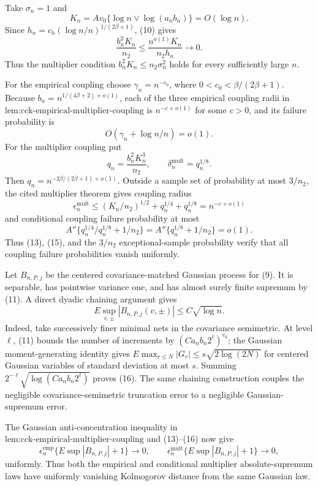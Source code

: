 Take \(\sigma_n=1\) and
\[
 K_n=Av_0\{\log n\vee\log(a_nb_n)\}=O(\log n).
\]
Since \(h_n=c_h(\log n/n)^{1/(2\beta+1)}\), (10) gives
\[
 \frac{b_n^2K_n}{n_2}
 \le\frac{n^{o(1)}K_n}{n_2h_n}\longrightarrow0. \tag{12}
\]
Thus the multiplier condition \(b_n^2K_n\le n_2\sigma_n^2\) holds for every sufficiently large \(n\).

For the empirical coupling choose \(\gamma_n=n^{-c_0}\), where
\(0<c_0<\beta/(2\beta+1)\).  Because
\(b_n=n^{1/(4\beta+2)+o(1)}\), each of the three empirical coupling radii in \(\text{lem:cck-empirical-multiplier-coupling}\) is \(n^{-c+o(1)}\) for some \(c>0\), and its failure probability is
\[
 O(\gamma_n+\log n/n)=o(1). \tag{13}
\]
For the multiplier coupling put
\[
 q_n=\frac{b_n^2K_n^3}{n_2},
 \qquad \delta_n^{\mathrm{mult}}=q_n^{1/8}.
\]
Then \(q_n=n^{-2\beta/(2\beta+1)+o(1)}\).  Outside a sample set of probability at most \(3/n_2\), the cited multiplier theorem gives coupling radius
\[
 \epsilon_n^{\mathrm{mult}}
 \le (K_n/n_2)^{1/2}+q_n^{1/4}+q_n^{1/8}
 =n^{-c+o(1)} \tag{14}
\]
and conditional coupling failure probability at most
\[
 A''\{q_n^{1/4}/q_n^{1/8}+1/n_2\}
 =A''\{q_n^{1/8}+1/n_2\}=o(1). \tag{15}
\]
Thus (13), (15), and the \(3/n_2\) exceptional-sample probability verify that all coupling failure probabilities vanish uniformly.

Let \(B_{n,P,j}\) be the centered covariance-matched Gaussian process for (9).  It is separable, has pointwise variance one, and has almost surely finite supremum by (11).  A direct dyadic chaining argument gives
\[
 E\sup_{v,\pm}|B_{n,P,j}(v,\pm)|\le C\sqrt{\log n}. \tag{16}
\]
Indeed, take successively finer minimal nets in the covariance semimetric.  At level \(\ell\), (11) bounds the number of increments by \((Ca_nb_n2^\ell)^{v_0}\); the Gaussian moment-generating identity gives
\(E\max_{r\le N}|G_r|\le s\sqrt{2\log(2N)}\) for centered Gaussian variables of standard deviation at most \(s\).  Summing
\(2^{-\ell}\sqrt{\log(Ca_nb_n2^\ell)}\) proves (16).  The same chaining construction couples the negligible covariance-semimetric truncation error to a negligible Gaussian-supremum error.

The Gaussian anti-concentration inequality in \(\text{lem:cck-empirical-multiplier-coupling}\) and (13)--(16) now give
\[
 \epsilon_n^{\mathrm{emp}}\{E\sup|B_{n,P,j}|+1\}\to0,
 \qquad
 \epsilon_n^{\mathrm{mult}}\{E\sup|B_{n,P,j}|+1\}\to0, \tag{17}
\]
uniformly.  Thus both the empirical and conditional multiplier absolute-supremum laws have uniformly vanishing Kolmogorov distance from the same Gaussian law.

